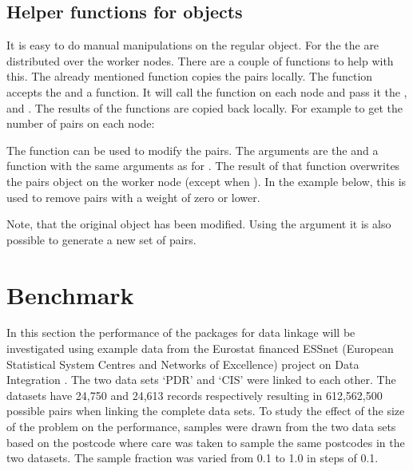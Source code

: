 \subsection{Helper functions for  objects}

It is easy to do manual manipulations on the regular  object. For the
 the  are distributed over the worker nodes. There are a couple of
functions to help with this. The already mentioned  function copies the pairs
locally. The  function accepts the  and a function. It will
call the function on each node and pass it the ,  and . The results of
the functions are copied back locally. For example to get the number of pairs on each node:

The  function can be used to modify the pairs. The arguments are the
 and a function with the same arguments as for . The result
of that function overwrites the pairs object on the worker node (except when ). In the
example below, this is used to remove pairs with a weight of zero or lower.
Note, that the original  object has been modified. Using the  argument
it is also possible to generate a new set of pairs.


\section{Benchmark}

In this section the performance of the packages for data linkage will be investigated using example
data from the Eurostat financed ESSnet (European Statistical System Centres and Networks of
Excellence) project on Data Integration \citep{onsdata}. The two data sets `PDR' and `CIS' were
linked to each other. The datasets have 24,750 and 24,613 records respectively resulting in
612,562,500 possible pairs when linking the complete data sets. To study the effect of the size of
the problem on the performance, samples were drawn from the two data sets based on the postcode
where care was taken to sample the same postcodes in the two datasets. The sample fraction was
varied from 0.1 to 1.0 in steps of 0.1. 

